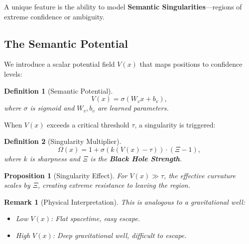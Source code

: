 \documentclass[12pt,letterpaper,twoside]{article}
\newtheorem{definition}{Definition}[section]
\newtheorem{remarque}{Remark}[section]
\newtheorem{prop}{Proposition}[section]
\begin{document}
A unique feature is the ability to model \textbf{Semantic Singularities}---regions of extreme confidence or ambiguity.

\subsection{The Semantic Potential}

We introduce a scalar potential field $V(x)$ that maps positions to confidence levels:

\begin{definition}[Semantic Potential]
\[
V(x) = \sigma(W_v x + b_v),
\]
where $\sigma$ is sigmoid and $W_v, b_v$ are learned parameters.
\end{definition}

When $V(x)$ exceeds a critical threshold $\tau$, a singularity is triggered:

\begin{definition}[Singularity Multiplier]
\[
\Omega(x) = 1 + \sigma\left(k\left(V(x) - \tau\right)\right) \cdot (\Xi - 1),
\]
where $k$ is sharpness and $\Xi$ is the \textbf{Black Hole Strength}.
\end{definition}

\begin{prop}[Singularity Effect]
For $V(x) \gg \tau$, the effective curvature scales by $\Xi$, creating extreme resistance to leaving the region.
\end{prop}

\begin{remarque}[Physical Interpretation]
This is analogous to a gravitational well:
\begin{itemize}
\item Low $V(x)$: Flat spacetime, easy escape.
\item High $V(x)$: Deep gravitational well, difficult to escape.
\end{itemize}
\end{remarque}
\end{document}
